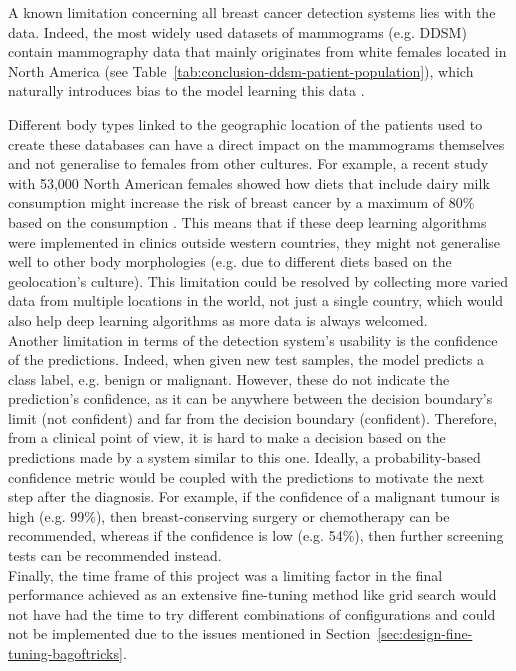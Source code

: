 A known limitation concerning all breast cancer detection systems lies with the data. Indeed, the most widely used datasets of mammograms (e.g. DDSM) contain mammography data that mainly originates from white females located in North America (see Table~\ref{tab:conclusion-ddsm-patient-population}), which naturally introduces bias to the model learning this data \citep{Yala2019}.



Different body types linked to the geographic location of the patients used to create these databases can have a direct impact on the mammograms themselves and not generalise to females from other cultures. For example, a recent study with 53,000 North American females showed how diets that include dairy milk consumption might increase the risk of breast cancer by a maximum of 80\% based on the consumption \citep{Fraser2020}. This means that if these deep learning algorithms were implemented in clinics outside western countries, they might not generalise well to other body morphologies (e.g. due to different diets based on the geolocation's culture). This limitation could be resolved by collecting more varied data from multiple locations in the world, not just a single country, which would also help deep learning algorithms as more data is always welcomed.\\

Another limitation in terms of the detection system's usability is the confidence of the predictions. Indeed, when given new test samples, the model predicts a class label, e.g. benign or malignant. However, these do not indicate the prediction's confidence, as it can be anywhere between the decision boundary's limit (not confident) and far from the decision boundary (confident). Therefore, from a clinical point of view, it is hard to make a decision based on the predictions made by a system similar to this one. Ideally, a probability-based confidence metric would be coupled with the predictions to motivate the next step after the diagnosis. For example, if the confidence of  a malignant tumour is high (e.g. 99\%),  then breast-conserving surgery or chemotherapy can be recommended, whereas if the confidence is low (e.g. 54\%), then further screening tests can be recommended instead.\\

Finally, the time frame of this project was a limiting factor in the final performance achieved as an extensive fine-tuning method like grid search would not have had the time to try different combinations of configurations and could not be implemented due to the issues mentioned in Section~\ref{sec:design-fine-tuning-bagoftricks}.
    
